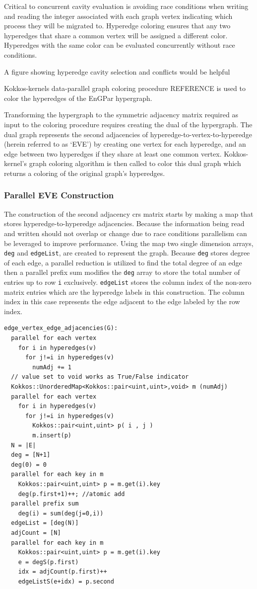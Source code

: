 \documentclass[graybox]{svmult}
\begin{document}
Critical to concurrent cavity evaluation is avoiding race conditions when
writing and reading the integer associated with each graph vertex indicating
which process they will be migrated to.
Hyperedge coloring ensures that any two hyperedges that share a common vertex
will be assigned a different color.
Hyperedges with the same color can be evaluated concurrently without
race conditions.

{\color{red}A figure showing hyperedge cavity selection and conflicts would be
helpful}

Kokkos-kernels data-parallel graph coloring procedure REFERENCE is used to
color the hyperedges of the EnGPar hypergraph.

Transforming the hypergraph to the symmetric adjacency matrix required as input
to the coloring procedure requires creating the dual of the hypergraph.
The dual graph represents the second adjacencies of
hyperedge-to-vertex-to-hyperedge (herein referred to as `EVE') by creating one
vertex for each hyperedge, and an edge between two hyperedges if they share at
least one common vertex.
Kokkos-kernel's graph coloring algorithm is then called to color this dual graph
which returns a coloring of the original graph's hyperedges.

\subsubsection{Parallel EVE Construction}

The construction of the second adjacency crs matrix starts by making a
map that stores hyperedge-to-hyperedge adjacencies. Because the information being read and written should not overlap or change due to race conditions parallelism can be leveraged to improve performance. Using the map two single dimension arrays, \verb|deg| and \verb|edgeList|, are created to represent the graph. Because \verb|deg| stores degree of each edge, a parallel reduction is utilized to find the total degree of an edge then a parallel prefix sum modifies the \verb|deg| array to store the total number of entries up to row \verb|i| exclusively. \verb|edgeList| stores the column index of the non-zero matrix entries which are the hyperedge labels in this construction. The column index in this case represents the edge adjacent to the edge labeled by the row index.

\begin{verbatim}
edge_vertex_edge_adjacencies(G):
  parallel for each vertex
    for i in hyperedges(v)
      for j!=i in hyperedges(v)
        numAdj += 1 
  // value set to void works as True/False indicator
  Kokkos::UnorderedMap<Kokkos::pair<uint,uint>,void> m (numAdj)
  parallel for each vertex
    for i in hyperedges(v)
      for j!=i in hyperedges(v)
        Kokkos::pair<uint,uint> p( i , j )
        m.insert(p)       
  N = |E|
  deg = [N+1]
  deg(0) = 0
  parallel for each key in m
    Kokkos::pair<uint,uint> p = m.get(i).key 
    deg(p.first+1)++; //atomic add    
  parallel prefix sum 
    deg(i) = sum(deg(j=0,i))  
  edgeList = [deg(N)]
  adjCount = [N]
  parallel for each key in m
    Kokkos::pair<uint,uint> p = m.get(i).key
    e = degS(p.first)
    idx = adjCount(p.first)++
    edgeListS(e+idx) = p.second
\end{verbatim}
\end{document}
